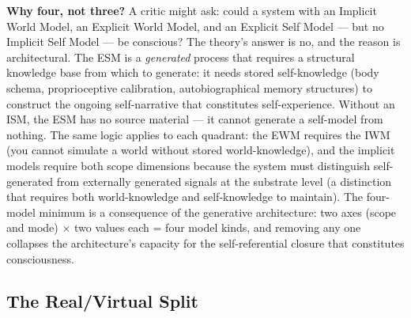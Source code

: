 \documentclass[12pt]{article}
\newcommand{\revend}{}
\begin{document}
{\textbf{Why four, not three?} A critic might ask: could a system with an Implicit World Model, an Explicit World Model, and an Explicit Self Model --- but no Implicit Self Model --- be conscious? The theory's answer is no, and the reason is architectural. The ESM is a \emph{generated} process that requires a structural knowledge base from which to generate: it needs stored self-knowledge (body schema, proprioceptive calibration, autobiographical memory structures) to construct the ongoing self-narrative that constitutes self-experience. Without an ISM, the ESM has no source material --- it cannot generate a self-model from nothing. The same logic applies to each quadrant: the EWM requires the IWM (you cannot simulate a world without stored world-knowledge), and the implicit models require both scope dimensions because the system must distinguish self-generated from externally generated signals at the substrate level (a distinction that requires both world-knowledge and self-knowledge to maintain). The four-model minimum is a consequence of the generative architecture: two axes (scope and mode) $\times$ two values each = four model kinds, and removing any one collapses the architecture's capacity for the self-referential closure that constitutes consciousness.\revend}


\subsection{The Real/Virtual Split}
\end{document}
